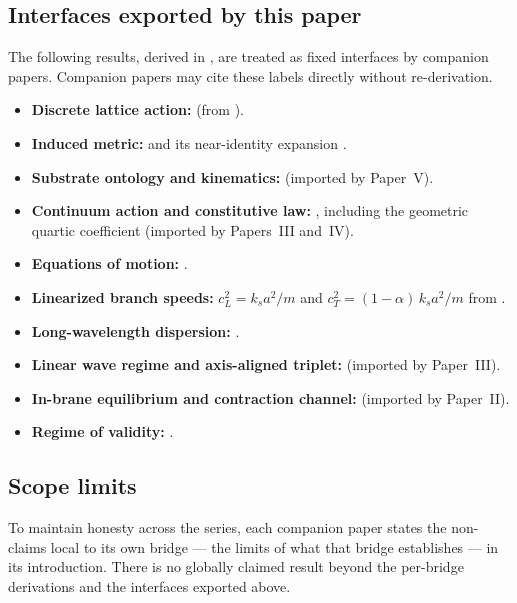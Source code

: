 \subsection{Interfaces exported by this paper}

The following results, derived in , are treated as fixed
interfaces by companion papers.
Companion papers may cite these labels directly without re-derivation.

\begin{itemize}
  \item \textbf{Discrete lattice action:}  (from
  ).
  \item \textbf{Induced metric:}  and its near-identity expansion
  .
  \item \textbf{Substrate ontology and kinematics:} 
  (imported by Paper~V).
  \item \textbf{Continuum action and constitutive law:}
  , including the geometric quartic coefficient
   (imported by Papers~III and~IV).
  \item \textbf{Equations of motion:} .
  \item \textbf{Linearized branch speeds:}
  $c_L^2 = k_s a^2/m$ and $c_T^2 = (1-\alpha)\,k_s a^2/m$
  from .
  \item \textbf{Long-wavelength dispersion:} .
  \item \textbf{Linear wave regime and axis-aligned triplet:} 
  (imported by Paper~III).
  \item \textbf{In-brane equilibrium and contraction channel:} 
  (imported by Paper~II).
  \item \textbf{Regime of validity:} .
\end{itemize}

\subsection{Scope limits}

To maintain honesty across the series, each companion paper states the non-claims local to its
own bridge --- the limits of what that bridge establishes --- in its introduction.
There is no globally claimed result beyond the per-bridge derivations and the interfaces exported
above.